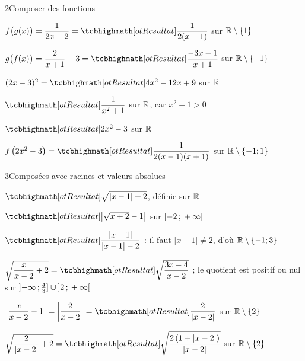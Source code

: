 \begin{deuxcolonnes}
\begin{corrige}{2}{Composer des fonctions}
\begin{questions}
  \item $f\big(g(x)\big)=\dfrac{1}{2x-2}=\res{\dfrac{1}{2(x-1)}}$ sur $\mathbb{R}\setminus\{1\}$
  \item $g\big(f(x)\big)=\dfrac{2}{x+1}-3=\res{\dfrac{-3x-1}{x+1}}$ sur $\mathbb{R}\setminus\{-1\}$
  \item $(2x-3)^{2}=\res{4x^{2}-12x+9}$ sur $\mathbb{R}$
  \item $\res{\dfrac{1}{x^{2}+1}}$ sur $\mathbb{R}$, car $x^{2}+1>0$
  \item $\res{2x^{2}-3}$ sur $\mathbb{R}$
  \item $f\left(2x^{2}-3\right)=\res{\dfrac{1}{2(x-1)(x+1)}}$ sur $\mathbb{R}\setminus\{-1;1\}$
\end{questions}
\end{corrige}

\begin{corrige}{3}{Composées avec racines et valeurs absolues}
\begin{questions}
  \item $\res{\sqrt{|x-1|+2}}$, définie sur $\mathbb{R}$
  \item $\res{\left|\sqrt{x+2}-1\right|}$ sur $\mathopen{[}-2\,{;}\,+\infty\mathclose{[}$
  \item $\res{\dfrac{|x-1|}{|x-1|-2}}$ : il faut $|x-1|\neq2$, d'où $\mathbb{R}\setminus\{-1;3\}$
  \item $\sqrt{\dfrac{x}{x-2}+2}=\res{\sqrt{\dfrac{3x-4}{x-2}}}$ ; le quotient est positif ou nul sur $\mathopen{]}-\infty\,{;}\,\frac43\mathclose{]}\cup\mathopen{]}2\,{;}\,+\infty\mathclose{[}$
  \item $\left|\dfrac{x}{x-2}-1\right|=\left|\dfrac{2}{x-2}\right|=\res{\dfrac{2}{|x-2|}}$ sur $\mathbb{R}\setminus\{2\}$
  \item $\sqrt{\dfrac{2}{|x-2|}+2}=\res{\sqrt{\dfrac{2\left(1+|x-2|\right)}{|x-2|}}}$ sur $\mathbb{R}\setminus\{2\}$
\end{questions}
\end{corrige}


\end{deuxcolonnes}
